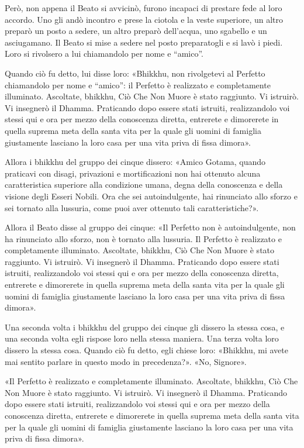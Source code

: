 Però, non appena il Beato si avvicinò, furono incapaci di prestare fede al loro
accordo. Uno gli andò incontro e prese la ciotola e la veste superiore, un altro
preparò un posto a sedere, un altro preparò dell’acqua, uno sgabello e un
asciugamano. Il Beato si mise a sedere nel posto preparatogli e si lavò i piedi.
Loro si rivolsero a lui chiamandolo per nome e “amico”.

Quando ciò fu detto, lui disse loro: «Bhikkhu, non rivolgetevi al Perfetto
chiamandolo per nome e “amico”: il Perfetto è realizzato e completamente
illuminato. Ascoltate, bhikkhu, Ciò Che Non Muore è stato raggiunto. Vi
istruirò. Vi insegnerò il Dhamma. Praticando dopo essere stati istruiti,
realizzandolo voi stessi qui e ora per mezzo della conoscenza diretta, entrerete
e dimorerete in quella suprema meta della santa vita per la quale gli uomini di
famiglia giustamente lasciano la loro casa per una vita priva di fissa dimora».

Allora i bhikkhu del gruppo dei cinque dissero: «Amico Gotama, quando praticavi
con disagi, privazioni e mortificazioni non hai ottenuto alcuna caratteristica
superiore alla condizione umana, degna della conoscenza e della visione degli
Esseri Nobili. Ora che sei autoindulgente, hai rinunciato allo sforzo e sei
tornato alla lussuria, come puoi aver ottenuto tali caratteristiche?».

Allora il Beato disse al gruppo dei cinque: «Il Perfetto non è autoindulgente,
non ha rinunciato allo sforzo, non è tornato alla lussuria. Il Perfetto è
realizzato e completamente illuminato. Ascoltate, bhikkhu, Ciò Che Non Muore è
stato raggiunto. Vi istruirò. Vi insegnerò il Dhamma. Praticando dopo essere
stati istruiti, realizzandolo voi stessi qui e ora per mezzo della conoscenza
diretta, entrerete e dimorerete in quella suprema meta della santa vita per la
quale gli uomini di famiglia giustamente lasciano la loro casa per una vita
priva di fissa dimora».

Una seconda volta i bhikkhu del gruppo dei cinque gli dissero la stessa cosa, e
una seconda volta egli rispose loro nella stessa maniera. Una terza volta loro
dissero la stessa cosa. Quando ciò fu detto, egli chiese loro: «Bhikkhu, mi
avete mai sentito parlare in questo modo in precedenza?». «No, Signore».

«Il Perfetto è realizzato e completamente illuminato. Ascoltate, bhikkhu, Ciò
Che Non Muore è stato raggiunto. Vi istruirò. Vi insegnerò il Dhamma. Praticando
dopo essere stati istruiti, realizzandolo voi stessi qui e ora per mezzo della
conoscenza diretta, entrerete e dimorerete in quella suprema meta della santa
vita per la quale gli uomini di famiglia giustamente lasciano la loro casa per
una vita priva di fissa dimora».


